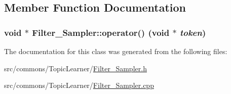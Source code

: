 \subsection{Member Function Documentation}
\hypertarget{class_filter___sampler_a7fab77093976d4dfcc6564dcf09c96a6}{
\subsubsection[{operator()}]{\setlength{\rightskip}{0pt plus 5cm}void $\ast$ Filter\_\-Sampler::operator() (void $\ast$ {\em token})}}
\label{class_filter___sampler_a7fab77093976d4dfcc6564dcf09c96a6}


The documentation for this class was generated from the following files:\begin{DoxyCompactItemize}
\item 
src/commons/TopicLearner/\hyperlink{_filter___sampler_8h}{Filter\_\-Sampler.h}\item 
src/commons/TopicLearner/\hyperlink{_filter___sampler_8cpp}{Filter\_\-Sampler.cpp}\end{DoxyCompactItemize}
